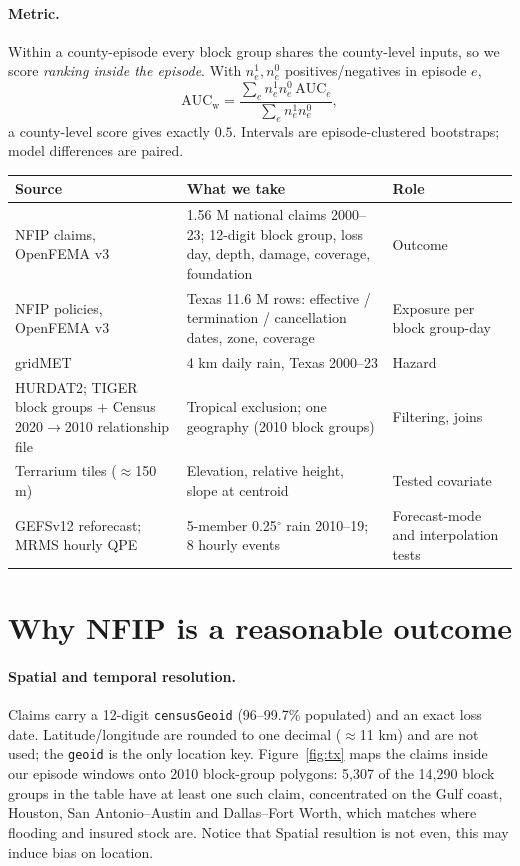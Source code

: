 \documentclass[11pt]{article}
\newcommand{\tc}[1]{\texttt{#1}}
\newcommand{\AUCw}{\mathrm{AUC}_{\mathrm{w}}}
\begin{document}
\paragraph{Metric.}
Within a county-episode every block group shares the county-level inputs, so we score \emph{ranking inside the episode}. With $n^1_e,n^0_e$ positives/negatives in episode $e$,
\[
\AUCw=\frac{\sum_e n^1_e n^0_e\,\mathrm{AUC}_e}{\sum_e n^1_e n^0_e},
\]
a county-level score gives exactly $0.5$. Intervals are episode-clustered bootstraps; model differences are paired.

\begin{center}\small
\begin{tabularx}{\textwidth}{@{}p{3.2cm}Xp{3.4cm}@{}}
\toprule
Source & What we take & Role \\
\midrule
NFIP claims, OpenFEMA v3 & 1.56 M national claims 2000--23; 12-digit block group, loss day, depth, damage, coverage, foundation & Outcome \\
NFIP policies, OpenFEMA v3 & Texas 11.6 M rows: effective / termination / cancellation dates, zone, coverage & Exposure per block group-day \\
gridMET & 4 km daily rain, Texas 2000--23 & Hazard \\
HURDAT2; TIGER block groups + Census 2020$\to$2010 relationship file & Tropical exclusion; one geography (2010 block groups) & Filtering, joins \\
Terrarium tiles ($\approx$150 m) & Elevation, relative height, slope at centroid & Tested covariate \\
GEFSv12 reforecast; MRMS hourly QPE & 5-member 0.25$^\circ$ rain 2010--19; 8 hourly events & Forecast-mode and interpolation tests \\
\bottomrule
\end{tabularx}
\end{center}

\section{Why NFIP is a reasonable outcome}

\paragraph{Spatial and temporal resolution.}
Claims carry a 12-digit \tc{censusGeoid} (96--99.7\% populated) and an exact loss date. Latitude/longitude are rounded to one decimal ($\approx$11 km) and are not used; the \tc{geoid} is the only location key. Figure~\ref{fig:tx} maps the claims inside our episode windows onto 2010 block-group polygons: 5,307 of the 14,290 block groups in the table have at least one such claim, concentrated on the Gulf coast, Houston, San Antonio--Austin and Dallas--Fort Worth, which matches where flooding and insured stock are. Notice that Spatial resultion is not even, this may induce bias on location.
\end{document}
